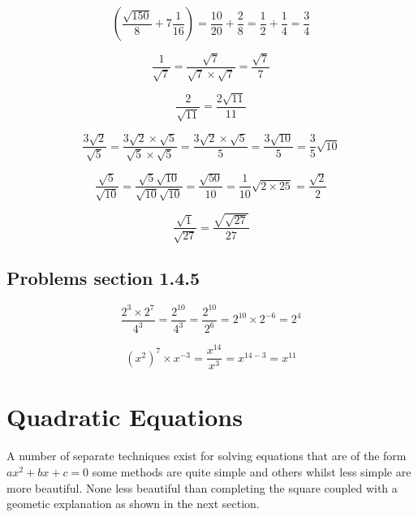 \begin{equation}
 \left (  \frac{\sqrt{150}}{8} + 7\frac{1}{16}\right ) = \frac{10}{20} + \frac{2}{8} = \frac{1}{2} + \frac{1}{4} = \frac{3}{4}
\end{equation}

\begin{equation}
  \frac{1}{\sqrt{7}} =  \frac{\sqrt{7}}{\sqrt{7} \times \sqrt{7}} = \frac{\sqrt{7}}{7}
\end{equation}

\begin{equation}
  \frac{2}{\sqrt{11}} = \frac{2 \sqrt{11}}{11}
\end{equation}

\begin{equation}
  \frac{3 \sqrt{2}}{\sqrt{5}} = \frac{3 \sqrt{2} \times \sqrt{5}}{\sqrt{5} \times \sqrt{5}} = \frac{3 \sqrt{2} \times \sqrt{5}}{5} = \frac{3 \sqrt{10}}{5} = \frac{3}{5}\sqrt{10}
\end{equation}

\begin{equation}
  \frac{\sqrt{5}}{\sqrt{10}} = \frac{\sqrt{5} \sqrt{10}}{\sqrt{10}\sqrt{10}} = \frac{\sqrt{50}}{10} = \frac{1}{10} \sqrt{2 \times 25} = \frac{\sqrt{2}}{2}
\end{equation}

\begin{equation}
  \frac{\sqrt{1}}{\sqrt{27}} = \frac{\sqrt{\sqrt{27}}}{27}
\end{equation}

\subsection{Problems section 1.4.5}

\begin{equation}
  \frac{2^{3} \times 2^{7}}{4^{3}} = \frac{2^{10}}{4^{3}} = \frac{2^{10}}{2^{6}} = 2^{10} \times 2^{-6} = 2^{4}
\end{equation}

\begin{equation}
  (x^{2})^{7} \times x^{-3} = \frac{x^{14}}{x^{3}} = x^{14-3} = x^{11}
\end{equation}



\section{Quadratic Equations}

A number of separate techniques exist for solving equations that are of the form $ ax^{2} +bx + c = 0 $ some methods are quite simple and others whilst less simple are more beautiful. None less beautiful than completing the square coupled with a geometic explanation as shown in the next section.

